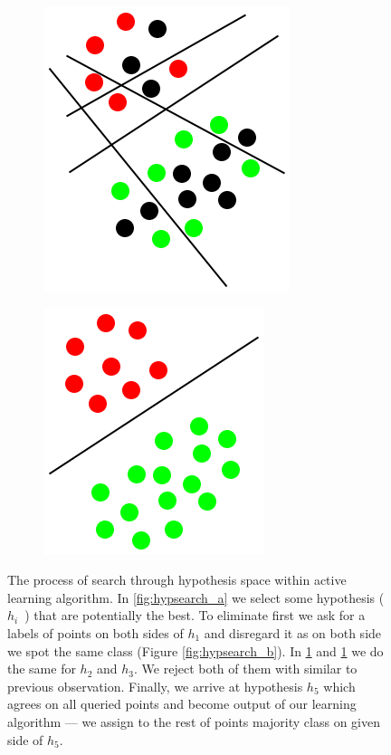 \documentclass[12pt, a4paper, pdflatex]{report}
\begin{document}
\begin{figure}[htbp]
\begin{subfigure}[b]{0.3\textwidth}
    \caption{\label{fig:hypsearch_c}}
  \end{subfigure}
  \begin{subfigure}[b]{0.3\textwidth}
    \centering
    \includegraphics[width=0.5\linewidth]{graphics/hypsearch4.png}
    \caption{\label{fig:hypsearch_d}}
  \end{subfigure}
  \begin{subfigure}[b]{0.3\textwidth}
    \centering
    \includegraphics[width=0.5\linewidth]{graphics/hypsearch5.png}
    \caption{\label{fig:hypsearch_e}}
  \end{subfigure}
\begin{tiny}
\caption{The process of search through hypothesis space within active learning algorithm. In \ref{fig:hypsearch_a} we select some hypothesis (~$h_i$~) that are potentially the best. To eliminate first we ask for a labels of points on both sides of $h_1$ and disregard it as on both side we spot the same class (Figure \ref{fig:hypsearch_b}). In \ref{fig:hypsearch_c} and \ref{fig:hypsearch_c} we do the same for $h_2$ and $h_3$. We reject both of them with similar to previous observation. Finally, we arrive at hypothesis $h_5$ which agrees on all queried points and become output of our learning algorithm --- we assign to the rest of points majority class on given side of $h_5$.\label{fig:hypsearch}}
\end{tiny}
\vspace{1cm}
\end{figure}
\end{document}
